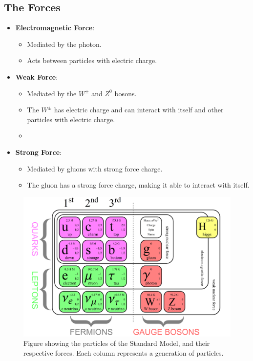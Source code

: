 \subsection{The Forces}
\begin{itemize}
    \item \textbf{Electromagnetic Force}: 
    \begin{itemize}
        \item Mediated by the photon.
        \item Acts between particles with electric charge.
    \end{itemize} 
    \item \textbf{Weak Force}: 
    \begin{itemize}
        \item Mediated by the $W^{\pm}$ and $Z^0$ bosons.
        \item The $W^{±}$ has electric charge and can interact with itself and other particles with electric charge.
        \item 
    \end{itemize}
    \item \textbf{Strong Force}: 
    \begin{itemize}
        \item Mediated by gluons with strong force charge. 
        \item  The gluon has a strong force charge, making it able to interact with itself. 
    \end{itemize}
\end{itemize}

\begin{figure}[h!]
\centering
\includegraphics[width = .9\textwidth]{SM_particles.png}
\caption{Figure showing the particles of the Standard Model, and their respective forces. Each column represents a generation of particles.}
\label{fig: SM_particles}
\end{figure}


